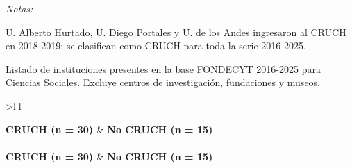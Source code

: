 \documentclass[
  12pt,
  letterpaper,
]{article}
\begin{document}
\begingroup\fontsize{10}{12}\selectfont

\begin{ThreePartTable}
\begin{TableNotes}
\item \textit{Notas:} 
\item U. Alberto Hurtado, U. Diego Portales y U. de los Andes ingresaron al CRUCH en 2018-2019; se clasifican como CRUCH para toda la serie 2016-2025.
\item Listado de instituciones presentes en la base FONDECYT 2016-2025 para Ciencias Sociales. Excluye centros de investigación, fundaciones y museos.
\end{TableNotes}

\begin{longtable}[t]{>{}l|l}

\caption{\label{tbl-clasificacion-instituciones}Clasificación de
instituciones según pertenencia al Consejo de Rectores (CRUCH)}

\tabularnewline

\toprule
\textbf{CRUCH (n = 30)} & \textbf{No CRUCH (n = 15)}\\
\midrule
\endfirsthead
{}\\
\toprule
\textbf{CRUCH (n = 30)} & \textbf{No CRUCH (n = 15)}\\
\midrule
\endhead


\end{longtable}
\end{ThreePartTable}
\end{document}
